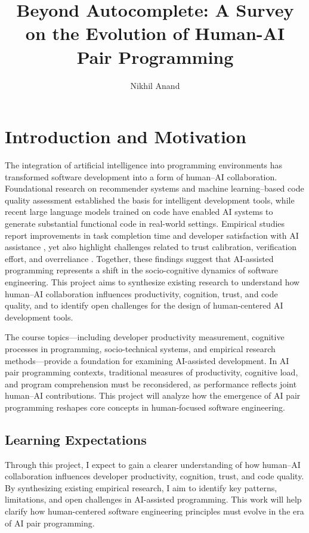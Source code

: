 \documentclass{article}      %
\title{Beyond Autocomplete: A Survey on the Evolution of Human-AI Pair Programming}  %
\author{Nikhil Anand}
\begin{document}

\maketitle                   %

\section*{Introduction and Motivation}
The integration of artificial intelligence into programming environments has transformed software development into a form of human–AI collaboration. Foundational research on recommender systems \cite{robillard2014recommender} and machine learning–based code quality assessment \cite{buseweimer2010learning} established the basis for intelligent development tools, while recent large language models trained on code \cite{chen2021evaluatingllm} have enabled AI systems to generate substantial functional code in real-world settings. Empirical studies report improvements in task completion time and developer satisfaction with AI assistance \cite{zeigler2022productivity,peng2023copilot}, yet also highlight challenges related to trust calibration, verification effort, and overreliance \cite{vaithilingam2022expectations}. Together, these findings suggest that AI-assisted programming represents a shift in the socio-cognitive dynamics of software engineering. This project aims to synthesize existing research to understand how human–AI collaboration influences productivity, cognition, trust, and code quality, and to identify open challenges for the design of human-centered AI development tools.

The course topics—including developer productivity measurement, cognitive processes in programming, socio-technical systems, and empirical research methods—provide a foundation for examining AI-assisted development. In AI pair programming contexts, traditional measures of productivity, cognitive load, and program comprehension must be reconsidered, as performance reflects joint human–AI contributions. This project will analyze how the emergence of AI pair programming reshapes core concepts in human-focused software engineering.

\subsection*{Learning Expectations}
Through this project, I expect to gain a clearer understanding of how human–AI collaboration influences developer productivity, cognition, trust, and code quality. By synthesizing existing empirical research, I aim to identify key patterns, limitations, and open challenges in AI-assisted programming. This work will help clarify how human-centered software engineering principles must evolve in the era of AI pair programming.
\end{document}
